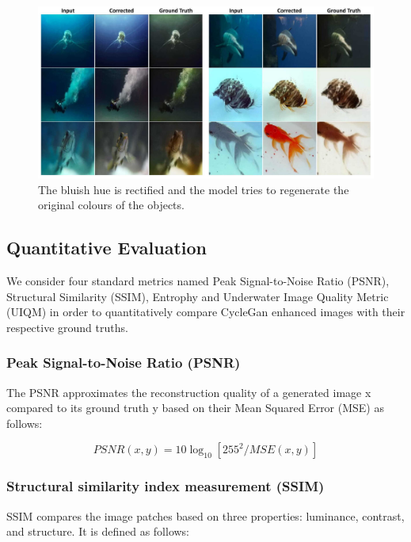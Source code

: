 \documentclass[a4paper]{article}
\begin{document}
\begin{figure}[H]
  \centering
  \includegraphics[width=1\textwidth]{qualitative-1.jpg}
  \caption{The bluish hue is rectified and the model tries to regenerate the original colours of the objects.}
  \label{fig:qualitativeanalysis}
\end{figure}

\subsection{Quantitative Evaluation}
We consider four standard metrics \cite{ignatov2017dslrquality,8578758,5596999} named Peak Signal-to-Noise Ratio (PSNR), Structural Similarity (SSIM), Entrophy and Underwater Image Quality Metric (UIQM) in order to quantitatively compare CycleGan enhanced images with their respective ground truths.

\subsubsection{Peak Signal-to-Noise Ratio (PSNR)}
The PSNR approximates the reconstruction quality of a generated image x compared to its ground truth y based on their Mean Squared Error (MSE) as follows:

\begin{equation}
    \label{eq:psnr}
    PSNR(x, y) = 10\log_{10}[255^{2}/MSE(x,y)]
\end{equation}

\subsubsection{Structural similarity index measurement (SSIM)}
SSIM \cite{wang2004imagequalityassesment} compares the image patches based on three properties: luminance, contrast, and structure. It is defined as follows:
\end{document}
